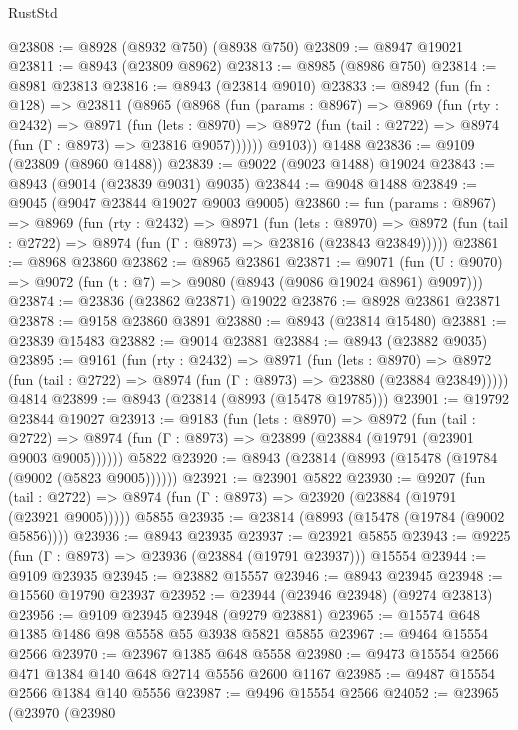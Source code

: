 \begin{lexlean}{RustStd}
\begin{coremodule}
{\begin{coremodule}
{{{{{{{{{{{{{{{{{{{{{{{{{{{{{{{{{{{{{{{@23808 := @8928 (@8932 @750) (@8938 @750)
@23809 := @8947 @19021
@23811 := @8943 (@23809 @8962)
@23813 := @8985 (@8986 @750)
@23814 := @8981 @23813
@23816 := @8943 (@23814 @9010)
@23833 := @8942
    (fun (fn : @128) =>
    @23811
      (@8965
        (@8968
          (fun (params : @8967) =>
          @8969
            (fun (rty : @2432) =>
            @8971
              (fun (lets : @8970) =>
              @8972 (fun (tail : @2722) => @8974 (fun (Γ : @8973) => @23816 @9057))))))
        @9103))
    @1488
@23836 := @9109 (@23809 (@8960 @1488))
@23839 := @9022 (@9023 @1488) @19024
@23843 := @8943 (@9014 (@23839 @9031) @9035)
@23844 := @9048 @1488
@23849 := @9045 (@9047 @23844 @19027 @9003 @9005)
@23860 := fun (params : @8967) =>
  @8969
    (fun (rty : @2432) =>
    @8971
      (fun (lets : @8970) =>
      @8972 (fun (tail : @2722) => @8974 (fun (Γ : @8973) => @23816 (@23843 @23849)))))
@23861 := @8968 @23860
@23862 := @8965 @23861
@23871 := @9071
    (fun (U : @9070) => @9072 (fun (t : @7) => @9080 (@8943 (@9086 @19024 @8961) @9097)))
@23874 := @23836 (@23862 @23871) @19022
@23876 := @8928 @23861 @23871
@23878 := @9158 @23860 @3891
@23880 := @8943 (@23814 @15480)
@23881 := @23839 @15483
@23882 := @9014 @23881
@23884 := @8943 (@23882 @9035)
@23895 := @9161
    (fun (rty : @2432) =>
    @8971
      (fun (lets : @8970) =>
      @8972 (fun (tail : @2722) => @8974 (fun (Γ : @8973) => @23880 (@23884 @23849)))))
    @4814
@23899 := @8943 (@23814 (@8993 (@15478 @19785)))
@23901 := @19792 @23844 @19027
@23913 := @9183
    (fun (lets : @8970) =>
    @8972
      (fun (tail : @2722) =>
      @8974 (fun (Γ : @8973) => @23899 (@23884 (@19791 (@23901 @9003 @9005))))))
    @5822
@23920 := @8943 (@23814 (@8993 (@15478 (@19784 (@9002 (@5823 @9005))))))
@23921 := @23901 @5822
@23930 := @9207
    (fun (tail : @2722) => @8974 (fun (Γ : @8973) => @23920 (@23884 (@19791 (@23921 @9005)))))
    @5855
@23935 := @23814 (@8993 (@15478 (@19784 (@9002 @5856))))
@23936 := @8943 @23935
@23937 := @23921 @5855
@23943 := @9225 (fun (Γ : @8973) => @23936 (@23884 (@19791 @23937))) @15554
@23944 := @9109 @23935
@23945 := @23882 @15557
@23946 := @8943 @23945
@23948 := @15560 @19790 @23937
@23952 := @23944 (@23946 @23948) (@9274 @23813)
@23956 := @9109 @23945 @23948 (@9279 @23881)
@23965 := @15574 @648 @1385 @1486 @98 @5558 @55 @3938 @5821 @5855
@23967 := @9464 @15554 @2566
@23970 := @23967 @1385 @648 @5558
@23980 := @9473 @15554 @2566 @471 @1384 @140 @648 @2714 @5556 @2600 @1167
@23985 := @9487 @15554 @2566 @1384 @140 @5556
@23987 := @9496 @15554 @2566
@24052 := @23965
    (@23970
      (@23980
}}}}}}}}}}}}}}}}}}}}}}}}}}}}}}}}}}}}}}}
\end{coremodule}}
\end{coremodule}
\end{lexlean}
